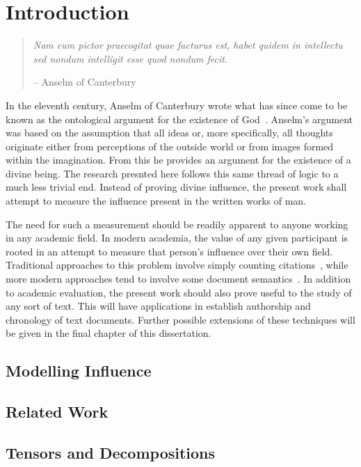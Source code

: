 \documentclass[../dissertation.tex]{subfiles}
\begin{document}
\chapter{Introduction}
\begin{quote}
\textit{Nam cum pictor praecogitat quae facturus est, habet quidem in intellectu sed nondum intelligit esse quod nondum fecit.}

-- Anselm of Canterbury~\cite{anselm}
\end{quote}
In the eleventh century, Anselm of Canterbury wrote what has since
come to be known as the ontological argument for the existence of
God~\cite{anselm}.  Anselm's argument was based on the assumption that
all ideas or, more specifically, all thoughts originate either from
perceptions of the outside world or from images formed within the
imagination.  From this he provides an argument for the existence of
a divine being.  The research presnted here follows this same thread
of logic to a much less trivial end.  Instead of proving divine
influence, the present work shall attempt to measure the influence
present in the written works of man.  

The need for such a measurement should be readily apparent to anyone
working in any academic field.  In modern academia, the value of any
given participant is rooted in an attempt to measure that person's
influence over their own field.  Traditional approaches to this
problem involve simply counting citations~\cite{**Use and Abuse**},
while more modern approaches tend to involve some document
semantics~\cite{**some semantic influence models**}.  In addition to
academic evaluation, the present work should also prove useful to the
study of any sort of text.  This will have applications in establish
authorship and chronology of text documents.  Further possible
extensions of these techniques will be given in the final chapter of
this dissertation.

\section{Modelling Influence}

\section{Related Work}

\section{Tensors and Decompositions}
\end{document}
